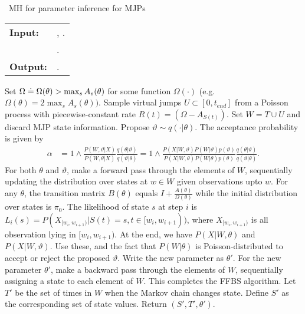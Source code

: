 \begin{algorithm}[H]
   \caption{\Naive\  MH for parameter inference for MJPs }
   \label{alg:MH_naive}
  \begin{tabular}{l l}
   \textbf{Input:  } & \text{Observations $X$}, 
                       \text{the previous MJP path $S(t) = (S, T)$ and parameters $\theta$ }.\\ 
                     & \text{A  Metropolis-Hasting proposal $q(\cdot | \theta)$}.\\
   \textbf{Output:  }& \text{A new MJP trajectory $S'(t) = (S', T')$, 
                            new MJP parameters $\theta'$}.\\
   \hline
   \end{tabular}
   \begin{algorithmic}[1]
     \State Set $\Omega \doteq \Omega(\theta) > \max_s{A_s(\theta)}$ for
     some function $\Omega(\cdot)$ (e.g.\ $\Omega(\theta) = 
      2\max_s A_s(\theta))$.
      \State Sample virtual jumps $U\subset[0, t_{end}]$ from a 
      Poisson process with piecewise-constant rate 
      $R(t) = (\Omega - A_{S(t)})$. 
    Set $W = T \cup U$ and discard MJP state information.
      \State Propose $\vartheta \sim q(\cdot| \theta)$.
          The acceptance probability is given by 
          \vspace{-.05in}
          \begin{align*}
          \alpha &=  1 \wedge \frac{P(W,\vartheta| X)}{P(W, \theta| X)} \frac{q(\theta|\vartheta)}{q(\vartheta|\theta)}
          =  1 \wedge \frac{P(X| W,\vartheta) P(W | \vartheta)p(\vartheta)}
            {P(X|W, \theta)P(W | \theta)p(\theta)} \frac{q(\theta|\vartheta)}{q(\vartheta|\theta)}.
          \end{align*}
          \vspace{-.1in}
    \State For both $\theta$ and $\vartheta$, make a forward pass through the 
    elements of $W$, sequentially updating the distribution over states at 
    $w \in W$ given observations upto $w$. 
    For any $\theta$, the transition matrix 
    $B(\theta)$ equals $I + \frac{A(\theta)}{\Omega(\theta)}$ while the initial distribution
      over states is $\pi_0$. The likelihood of state $s$ at step $i$ is 
      $ L_i(s) = P(X_{[w_i, w_{i + 1})} | S(t) = s , t \in [w_i, w_{i + 1})) 
      $, where $X_{[w_i,w_{i+1})}$ is all observation lying in 
      $[w_i,w_{i+1})$. %
    At the end, we have 
    $P(X|W,\theta)$ and $P(X|W,\vartheta)$. Use these, and the fact that 
    $P(W|\theta)$ is Poisson-distributed to accept or reject the
    proposed $\vartheta$. Write the new parameter as $\theta'$.
    \State For the new parameter $\theta'$, make a backward pass through 
    the elements of
    $W$, sequentially assigning a state to each element of $W$. This
    completes the FFBS algorithm.
    \State Let $T'$ be the set of times in $W$ when the Markov chain changes state. Define $S'$ as the corresponding set of state values. Return $(S', T', \theta')$.
\end{algorithmic}
\end{algorithm}
\vspace{-.32in}
